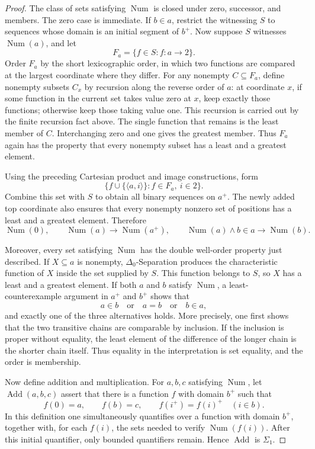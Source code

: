 \documentclass[11pt,a4paper]{article}
\theoremstyle{plain}
\theoremstyle{definition}
\theoremstyle{remark}
\begin{document}
\begin{proof}
  The class of sets satisfying \(\operatorname{Num}\) is closed under zero, successor, and members. The zero case is immediate. If \(b\in a\), restrict the witnessing \(S\) to sequences whose domain is an initial segment of \(b^+\). Now suppose \(S\) witnesses \(\operatorname{Num}(a)\), and let
  \[
    F_a=\{f\in S:f\colon a\longrightarrow2\}.
  \]
  Order \(F_a\) by the short lexicographic order, in which two functions are compared at the largest coordinate where they differ. For any nonempty \(C\subseteq F_a\), define nonempty subsets \(C_x\) by recursion along the reverse order of \(a\): at coordinate \(x\), if some function in the current set takes value zero at \(x\), keep exactly those functions; otherwise keep those taking value one. This recursion is carried out by the finite recursion fact above. The single function that remains is the least member of \(C\). Interchanging zero and one gives the greatest member. Thus \(F_a\) again has the property that every nonempty subset has a least and a greatest element.

  Using the preceding Cartesian product and image constructions, form
  \[
    \{f\cup\{\langle a,i\rangle\}:f\in F_a,\ i\in2\}.
  \]
  Combine this set with \(S\) to obtain all binary sequences on \(a^+\). The newly added top coordinate also ensures that every nonempty nonzero set of positions has a least and a greatest element. Therefore
  \[
  \operatorname{Num}(0),\qquad
  \operatorname{Num}(a)\longrightarrow\operatorname{Num}(a^+),\qquad
  \operatorname{Num}(a)\wedge b\in a\longrightarrow\operatorname{Num}(b).
  \]

  Moreover, every set satisfying \(\operatorname{Num}\) has the double well-order property just described. If \(X\subseteq a\) is nonempty, \(\Delta_0\)-Separation produces the characteristic function of \(X\) inside the set supplied by \(S\). This function belongs to \(S\), so \(X\) has a least and a greatest element. If both \(a\) and \(b\) satisfy \(\operatorname{Num}\), a least-counterexample argument in \(a^+\) and \(b^+\) shows that
  \[
    a\in b\quad\text{or}\quad a=b\quad\text{or}\quad b\in a,
  \]
  and exactly one of the three alternatives holds. More precisely, one first shows that the two transitive chains are comparable by inclusion. If the inclusion is proper without equality, the least element of the difference of the longer chain is the shorter chain itself. Thus equality in the interpretation is set equality, and the order is membership.

  Now define addition and multiplication. For \(a,b,c\) satisfying \(\operatorname{Num}\), let \(\operatorname{Add}(a,b,c)\) assert that there is a function \(f\) with domain \(b^+\) such that
  \[
    f(0)=a,\qquad f(b)=c,\qquad
    f(i^+)=f(i)^+\quad(i\in b).
  \]
  In this definition one simultaneously quantifies over a function with domain \(b^+\), together with, for each \(f(i)\), the sets needed to verify \(\operatorname{Num}(f(i))\). After this initial quantifier, only bounded quantifiers remain. Hence \(\operatorname{Add}\) is \(\Sigma_1\).


\end{proof}
\end{document}
